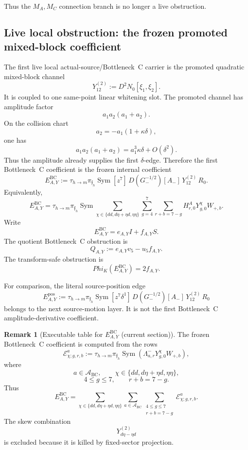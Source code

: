 \documentclass[11pt,a4paper]{amsart}
\def\Phi{Phi}%
\theoremstyle{plain}
\theoremstyle{definition}
\newtheorem{remark}[theorem]{Remark}
\begin{document}
Thus the \(M_A,M_C\) connection branch is no longer a live obstruction.

\subsection{Live local obstruction: the frozen promoted mixed-block coefficient}
\label{subsec:live-local-obstruction-eay-bc}

The first live local actual-source/Bottleneck~C carrier is the promoted
quadratic mixed-block channel
\[
Y_{12}^{(2)}:=D^2N_0[\xi_1,\xi_2].
\]
It is coupled to one same-point linear whitening slot.  The promoted channel
has amplitude factor
\[
a_1a_2(a_1+a_2).
\]
On the collision chart
\[
a_2=-a_1(1+\kappa\delta),
\]
one has
\[
a_1a_2(a_1+a_2)=a_1^3\kappa\delta+O(\delta^2).
\]
Thus the amplitude already supplies the first \(\delta\)-edge.  Therefore the
first Bottleneck~C coefficient is the frozen internal coefficient
\[
E_{A,Y}^{\mathrm{BC}}
:=
\tau_{h\to m}\pi_{\mathfrak f_h}
\operatorname{Sym}
[z^7]\,
D(G_-^{-1/2})[A_-]\,
Y_{12}^{(2)}\,
R_0.
\]
Equivalently,
\[
E_{A,Y}^{\mathrm{BC}}
=
\tau_{h\to m}\pi_{\mathfrak f_h}
\operatorname{Sym}
\sum_{\chi\in\{dd,d\eta+\eta d,\eta\eta\}}
\sum_{g=4}^{7}
\sum_{r+b=7-g}
H^A_{r,0}Y^\chi_{g,0}W_{+,b}.
\]
Write
\[
E_{A,Y}^{\mathrm{BC}}=e_{A,Y}I+f_{A,Y}S.
\]
The quotient Bottleneck~C obstruction is
\[
Q_{A,Y}:=e_{A,Y}v_5-u_5f_{A,Y}.
\]
The transform-safe obstruction is
\[
\Phi_K(E_{A,Y}^{\mathrm{BC}})=2f_{A,Y}.
\]

For comparison, the literal source-position edge
\[
E_{A,Y}^{\mathrm{pos}}
:=
\tau_{h\to m}\pi_{\mathfrak f_h}
\operatorname{Sym}
[z^7\delta^1]\,
D(G_-^{-1/2})[A_-]\,
Y_{12}^{(2)}\,
R_0
\]
belongs to the next source-motion layer.  It is not the first
Bottleneck~C amplitude-derivative coefficient.

\begin{remark}[Executable table for \(E_{A,Y}^{\mathrm{BC}}\) (current section)]
\label{rem:executable-table-eay-bc-current}
The frozen Bottleneck~C coefficient is computed from the rows
\[
\mathcal E^a_{\chi;g,r,b}
:=
\tau_{h\to m}\pi_{\mathfrak f_h}
\operatorname{Sym}
\left(
\Lambda^-_{a,r}Y^\chi_{g,0}W_{+,b}
\right),
\]
where
\[
a\in\mathcal A_{\mathrm{BC}},
\qquad
\chi\in\{dd,d\eta+\eta d,\eta\eta\},
\]
\[
4\le g\le7,
\qquad
r+b=7-g.
\]
Thus
\[
E_{A,Y}^{\mathrm{BC}}
=
\sum_{\chi\in\{dd,d\eta+\eta d,\eta\eta\}}
\sum_{a\in\mathcal A_{\mathrm{BC}}}
\sum_{\substack{4\le g\le7\\ r+b=7-g}}
\mathcal E^a_{\chi;g,r,b}.
\]
The skew combination
\[
Y_{d\eta-\eta d}^{(2)}
\]
is excluded because it is killed by fixed-sector projection.
\end{remark}
\end{document}
